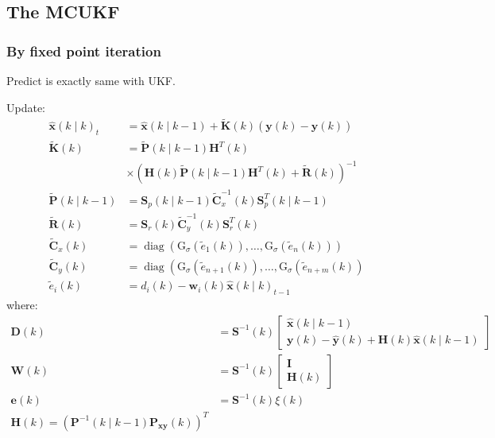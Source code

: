 \documentclass[dvipdfmx]{jsarticle}
\begin{document}
\subsection*{The MCUKF}
\subsubsection*{By fixed point iteration}
Predict is exactly same with UKF.

Update:
\begin{equation}\nonumber\label{Func.}\begin{aligned}
    \widehat{\mathbf{x}}(k \mid k)_{t}&= \widehat{\mathbf{x}}(k \mid k-1)+\widetilde{\mathbf{K}}(k)(\mathbf{y}(k)-\widehat{\mathbf{y}}(k)) \\
    \widetilde{\mathbf{K}}(k)&= \widetilde{\mathbf{P}}(k \mid k-1) \mathbf{H}^{T}(k) \\
    & \times\left(\mathbf{H}(k) \widetilde{\mathbf{P}}(k \mid k-1) \mathbf{H}^{T}(k)+\widetilde{\mathbf{R}}(k)\right)^{-1} \\
    \widetilde{\mathbf{P}}(k \mid k-1)&= \mathbf{S}_{p}(k \mid k-1) \widetilde{\mathbf{C}}_{x}^{-1}(k) \mathbf{S}_{p}^{T}(k \mid k-1) \\
    \widetilde{\mathbf{R}}(k)&= \mathbf{S}_{r}(k) \widetilde{\mathbf{C}}_{y}^{-1}(k) \mathbf{S}_{r}^{T}(k) \\
    \widetilde{\mathbf{C}}_{x}(k)&= \operatorname{diag}\left(\mathrm{G}_{\sigma}\left(\widetilde{e}_{1}(k)\right), \ldots, \mathrm{G}_{\sigma}\left(\widetilde{e}_{n}(k)\right)\right) \\
    \widetilde{\mathbf{C}}_{y}(k)&= \operatorname{diag}\left(\mathrm{G}_{\sigma}\left(\widetilde{e}_{n+1}(k)\right), \ldots, \mathrm{G}_{\sigma}\left(\widetilde{e}_{n+m}(k)\right)\right.\\
    \widetilde{e}_{i}(k) &=d_{i}(k)-\mathbf{w}_{i}(k) \widehat{\mathbf{x}}(k \mid k)_{t-1}
\end{aligned}\end{equation}
where:
\begin{equation}\nonumber\label{Func.}\begin{aligned}
    \mathbf{D}(k) &=\mathbf{S}^{-1}(k)\left[\begin{array}{c}
    \widehat{\mathbf{x}}(k \mid k-1) \\
    \mathbf{y}(k)-\widehat{\mathbf{y}}(k)+\mathbf{H}(k) \widehat{\mathbf{x}}(k \mid k-1)
    \end{array}\right] \\
    \mathbf{W}(k) &=\mathbf{S}^{-1}(k)\left[\begin{array}{c}
    \mathbf{I} \\
    \mathbf{H}(k)
    \end{array}\right] \\
    \mathbf{e}(k) &=\mathbf{S}^{-1}(k) \xi(k) \\
    \mathbf{H}(k)=\left(\mathbf{P}^{-1}(k \mid k-1) \mathbf{P}_{\mathbf{x y}}(k)\right)^{T}
\end{aligned}\end{equation}
\end{document}

